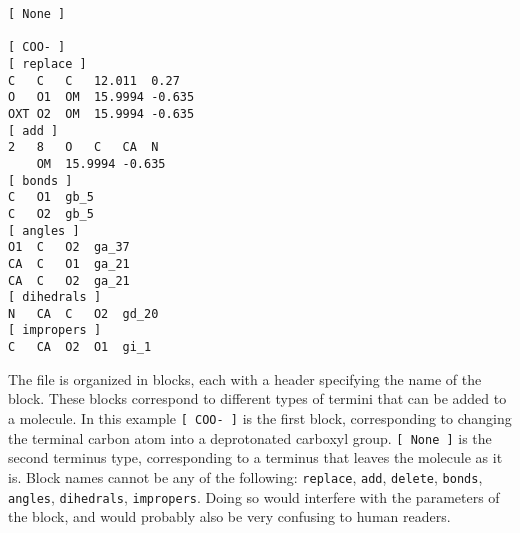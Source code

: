 {\small
\begin{verbatim}
[ None ]

[ COO- ]
[ replace ]
C	C	C	12.011	0.27
O 	O1	OM	15.9994	-0.635
OXT	O2	OM	15.9994	-0.635
[ add ]
2	8	O	C	CA	N
	OM	15.9994	-0.635
[ bonds ]
C	O1	gb_5
C	O2	gb_5
[ angles ]
O1	C	O2	ga_37
CA	C	O1	ga_21
CA	C	O2	ga_21
[ dihedrals ]
N	CA	C	O2	gd_20
[ impropers ]
C	CA	O2	O1	gi_1
\end{verbatim}}

The file is organized in blocks, each with a header specifying the
name of the block. These blocks correspond to different types of
termini that can be added to a molecule. In this example {\tt [~COO-~]}
is the first block, corresponding to changing the terminal carbon
atom into a deprotonated carboxyl group. {\tt [~None~]} is the
second terminus type, corresponding to a terminus that leaves
the molecule as it is. Block names cannot be any of the following:
{\tt replace}, {\tt add}, {\tt delete}, {\tt bonds}, {\tt angles},
{\tt dihedrals}, {\tt impropers}.  Doing so would interfere with
the parameters of the block, and would probably also be very confusing
to human readers.

